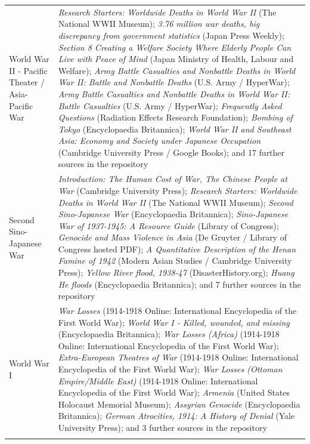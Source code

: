 \documentclass[11pt]{article}
\begin{document}
\begin{scriptsize}
\begin{longtable}{p{3.5cm} p{12.5cm}}
\addlinespace
World War II - Pacific Theater / Asia-Pacific War & \emph{Research Starters: Worldwide Deaths in World War II} (The National WWII Museum); \emph{3.76 million war deaths, big discrepancy from government statistics} (Japan Press Weekly); \emph{Section 8 Creating a Welfare Society Where Elderly People Can Live with Peace of Mind} (Japan Ministry of Health, Labour and Welfare); \emph{Army Battle Casualties and Nonbattle Deaths in World War II: Battle and Nonbattle Deaths} (U.S. Army / HyperWar); \emph{Army Battle Casualties and Nonbattle Deaths in World War II: Battle Casualties} (U.S. Army / HyperWar); \emph{Frequently Asked Questions} (Radiation Effects Research Foundation); \emph{Bombing of Tokyo} (Encyclopaedia Britannica); \emph{World War II and Southeast Asia: Economy and Society under Japanese Occupation} (Cambridge University Press / Google Books); and 17 further sources in the repository \\
\addlinespace
Second Sino-Japanese War & \emph{Introduction: The Human Cost of War, The Chinese People at War} (Cambridge University Press); \emph{Research Starters: Worldwide Deaths in World War II} (The National WWII Museum); \emph{Second Sino-Japanese War} (Encyclopaedia Britannica); \emph{Sino-Japanese War of 1937-1945: A Resource Guide} (Library of Congress); \emph{Genocide and Mass Violence in Asia} (De Gruyter / Library of Congress hosted PDF); \emph{A Quantitative Description of the Henan Famine of 1942} (Modern Asian Studies / Cambridge University Press); \emph{Yellow River flood, 1938-47} (DisasterHistory.org); \emph{Huang He floods} (Encyclopaedia Britannica); and 7 further sources in the repository \\
\addlinespace
World War I & \emph{War Losses} (1914-1918 Online: International Encyclopedia of the First World War); \emph{World War I - Killed, wounded, and missing} (Encyclopaedia Britannica); \emph{War Losses (Africa)} (1914-1918 Online: International Encyclopedia of the First World War); \emph{Extra-European Theatres of War} (1914-1918 Online: International Encyclopedia of the First World War); \emph{War Losses (Ottoman Empire/Middle East)} (1914-1918 Online: International Encyclopedia of the First World War); \emph{Armenia} (United States Holocaust Memorial Museum); \emph{Assyrian Genocide} (Encyclopaedia Britannica); \emph{German Atrocities, 1914: A History of Denial} (Yale University Press); and 3 further sources in the repository \\
\addlinespace

\end{longtable}
\end{scriptsize}
\end{document}
